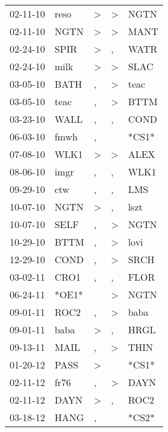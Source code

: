 \begin{supertabular}{lllll}
 02-11-10 &   reso &     \textgreater &     \textgreater &   NGTN \\
 02-11-10 &   NGTN &     \textgreater &     \textgreater &   MANT \\
 02-24-10 &   SPIR &     \textgreater &                , &   WATR \\
 02-24-10 &   milk &     \textgreater &     \textgreater &   SLAC \\
 03-05-10 &   BATH &                , &     \textgreater &   teac \\
 03-05-10 &   teac &                , &     \textgreater &   BTTM \\
 03-23-10 &   WALL &                , &                , &   COND \\
 06-03-10 &   fmwh &                , &                  &  *CS1* \\
 07-08-10 &   WLK1 &     \textgreater &     \textgreater &   ALEX \\
 08-06-10 &   imgr &                , &                , &   WLK1 \\
 09-29-10 &    ctw &                , &                , &    LMS \\
 10-07-10 &   NGTN &     \textgreater &                , &   lszt \\
 10-07-10 &   SELF &                , &     \textgreater &   NGTN \\
 10-29-10 &   BTTM &                , &     \textgreater &   lovi \\
 12-29-10 &   COND &                , &     \textgreater &   SRCH \\
 03-02-11 &   CRO1 &                , &                , &   FLOR \\
 06-24-11 &  *OE1* &                  &     \textgreater &   NGTN \\
 09-01-11 &   ROC2 &                , &     \textgreater &   baba \\
 09-01-11 &   baba &     \textgreater &                , &   HRGL \\
 09-13-11 &   MAIL &                , &     \textgreater &   THIN \\
 01-20-12 &   PASS &     \textgreater &                  &  *CS1* \\
 02-11-12 &   fr76 &                , &     \textgreater &   DAYN \\
 02-11-12 &   DAYN &     \textgreater &                , &   ROC2 \\
 03-18-12 &   HANG &                , &                  &  *CS2* \\

\end{supertabular}
